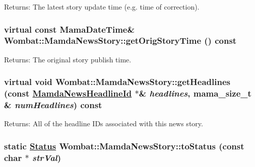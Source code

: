\begin{Desc}
\item[Returns:]The latest story update time (e.g. time of correction). \end{Desc}
\hypertarget{classWombat_1_1MamdaNewsStory_c71d0f49e28e1a631efd0a48506e02ba}{
\subsubsection[getOrigStoryTime]{\setlength{\rightskip}{0pt plus 5cm}virtual const Mama\-Date\-Time\& Wombat::Mamda\-News\-Story::get\-Orig\-Story\-Time () const}}
\label{classWombat_1_1MamdaNewsStory_c71d0f49e28e1a631efd0a48506e02ba}


\begin{Desc}
\item[Returns:]The original story publish time. \end{Desc}
\hypertarget{classWombat_1_1MamdaNewsStory_754f3330dc60b7607954fca775fcc6db}{
\subsubsection[getHeadlines]{\setlength{\rightskip}{0pt plus 5cm}virtual void Wombat::Mamda\-News\-Story::get\-Headlines (const \hyperlink{namespaceWombat_cb354a5fc91d5b728f8f1255aae3e196}{Mamda\-News\-Headline\-Id} $\ast$\& {\em headlines}, mama\_\-size\_\-t \& {\em num\-Headlines}) const}}
\label{classWombat_1_1MamdaNewsStory_754f3330dc60b7607954fca775fcc6db}


\begin{Desc}
\item[Returns:]All of the headline IDs associated with this news story. \end{Desc}
\hypertarget{classWombat_1_1MamdaNewsStory_801fa0d5802139ab91e348b3935d10fa}{
\subsubsection[toStatus]{\setlength{\rightskip}{0pt plus 5cm}static \hyperlink{classWombat_1_1MamdaNewsStory_25ee81ce6b01be03a95ab954acdb1e6d}{Status} Wombat::Mamda\-News\-Story::to\-Status (const char $\ast$ {\em str\-Val})}}
\label{classWombat_1_1MamdaNewsStory_801fa0d5802139ab91e348b3935d10fa}



